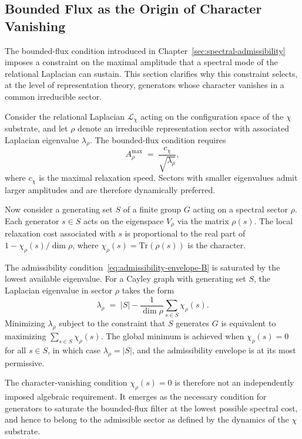 \subsection{Bounded Flux as the Origin of Character Vanishing}
  \label{subsec:bounded-flux-character-vanishing}

  The bounded-flux condition introduced in Chapter~\ref{sec:spectral-admissibility}
  imposes a constraint on the maximal amplitude that a spectral mode of the relational
  Laplacian can sustain.
  This section clarifies why this constraint selects, at the level of representation
  theory, generators whose character vanishes in a common irreducible sector.

  Consider the relational Laplacian $\mathcal{L}_\chi$ acting on the configuration space
  of the $\chi$ substrate, and let $\rho$ denote an irreducible representation sector
  with associated Laplacian eigenvalue $\lambda_\rho$.
  The bounded-flux condition requires
  \begin{equation}
    A_\rho^{\max} \;=\; \frac{c_\chi}{\sqrt{\lambda_\rho}},
    \label{eq:admissibility-envelope-B}
  \end{equation}
  where $c_\chi$ is the maximal relaxation speed.
  Sectors with smaller eigenvalues admit larger amplitudes and are therefore
  dynamically preferred.

  Now consider a generating set $S$ of a finite group $G$ acting on a spectral sector
  $\rho$.
  Each generator $s\in S$ acts on the eigenspace $V_\rho$ via the matrix $\rho(s)$.
  The local relaxation cost associated with $s$ is proportional to the real part of
  $1 - \chi_\rho(s)/\dim\rho$, where $\chi_\rho(s) = \mathrm{Tr}(\rho(s))$ is the
  character.

  The admissibility condition~\eqref{eq:admissibility-envelope-B} is saturated by the
  lowest available eigenvalue.
  For a Cayley graph with generating set $S$, the Laplacian eigenvalue in sector $\rho$
  takes the form
  \begin{equation}
    \lambda_\rho \;=\; |S| - \frac{1}{\dim\rho}\sum_{s\in S} \chi_\rho(s).
  \end{equation}
  Minimizing $\lambda_\rho$ subject to the constraint that $S$ generates $G$ is
  equivalent to maximizing $\sum_{s\in S}\chi_\rho(s)$.
  The global minimum is achieved when $\chi_\rho(s) = 0$ for all $s\in S$,
  in which case $\lambda_\rho = |S|$, and the admissibility envelope is at its most
  permissive.

  The character-vanishing condition $\chi_\rho(s)=0$ is therefore not an independently
  imposed algebraic requirement.
  It emerges as the necessary condition for generators to saturate the bounded-flux
  filter at the lowest possible spectral cost, and hence to belong to the admissible
  sector as defined by the dynamics of the $\chi$ substrate.

